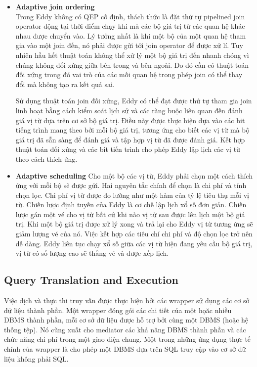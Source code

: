 \documentclass[a4paper]{article}
\begin{document}
\begin{itemize}
    \item \textbf{Adaptive join ordering}\\
    Trong Eddy không có QEP cố định, thách thức là đặt thứ tự pipelined join operator động tại thời điểm chạy khi mà các bộ giá trị từ các quan hệ khác nhau được chuyển vào. Lý tưởng nhất là khi một bộ của một quan hệ tham gia vào một join đến, nó phải được gửi tới join operator để được xử lí. Tuy nhiên hầu hết thuật toán không thể xử lý một bộ giá trị đến nhanh chóng vì chúng không đối xứng giữa bên trong và bên ngoài. Do đó cần có thuật toán đối xứng trong đó vai trò của các mối quan hệ trong phép join có thể thay đổi mà không tạo ra kết quả sai.


    Sử dụng thuật toán join đối xứng, Eddy có thể đạt được thứ tự tham gia join linh hoạt bằng cách kiểm soát lịch sử và các ràng buộc liên quan đến đánh giá vị từ dựa trên cơ sở bộ giá trị. Điều này được thực hiện dựa vào các bit tiếng trình mang theo bởi mỗi bộ giá trị, tương ứng cho biết các vị từ mà bộ giá trị đã sẵn sàng để đánh giá và tập hợp vị từ đã được đánh giá. Kết hợp thuật toán đối xứng và các bit tiến trình cho phép Eddy lập lịch các vị từ theo cách thích ứng.
    \item \textbf{Adaptive scheduling}
    Cho một bộ các vị từ, Eddy phải chọn một cách thích ứng với mỗi bộ sẽ được gửi. Hai nguyên tắc chính để chọn là chi phí và tính chọn lọc. Chi phí vị từ được đo lường như một hàm của tỷ lệ tiêu thụ mỗi vị từ. Chiến lược định tuyến của Eddy là cơ chế lập lịch xổ số đơn giản. Chiến lược gán một vé cho vị từ bất cứ khi nào vị từ sau được lên lịch một bộ giá trị. Khi một bộ giá trị được xử lý xong và trả lại cho Eddy vị từ tương ứng sẽ giảm lượng vé của nó. Việc kết hợp các tiêu chí chi phí và độ chọn lọc trở nên dễ dàng. Eddy liên tục chạy xổ số giữa các
   vị từ hiện đang yêu cầu bộ giá trị, vị từ có số lượng cao sẽ thắng vé và được xếp lịch.
\end{itemize}
\subsection{Query Translation and Execution}\label{subsec:query-translation-and-execution}
Việc dịch và thực thi truy vấn được thực hiện bởi các wrapper sử dụng các cơ sở dữ liệu thành phần. Một wrapper đóng gói các chi tiết của một họăc nhiều DBMS thành phần, mỗi cơ sở dữ liệu được hỗ trợ bởi cùng một DBMS (hoặc hệ thống tệp). Nó cũng xuất cho mediator các khả năng DBMS thành phần và các chức năng chi phí trong một giao diện chung. Một trong những ứng dụng thực tế chính của wrapper là cho phép một DBMS dựa trên SQL truy cập vào cơ sở dữ liệu không phải SQL.
\end{document}
